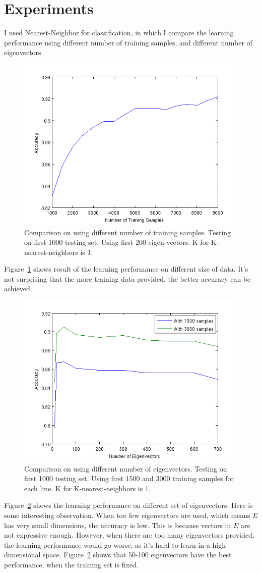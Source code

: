 \documentclass[10pt]{article}
\begin{document}
\section{Experiments}

I used Nearest-Neighbor for classification, in which I compare the
learning performance using different number of training samples, and
different number of eigenvectors.

\begin{figure}
\centering
\includegraphics[width=0.5\columnwidth]{diffDataSet.png}
\caption{Comparison on using different number of training samples.
Testing on first 1000 testing set. Using first 200 eigen-vectors. K
for K-nearest-neighbors is 1.}
\label{fig:dataset}
\end{figure}

Figure~\ref{fig:dataset} shows result of the learning performance on
different size of data. It's not surprising that the more training
data provided, the better accuracy can be achieved.

\begin{figure}
\centering
\includegraphics[width=0.5\columnwidth]{diffEVector.png}
\caption{Comparison on using different number of eigenvectors.
Testing on first 1000 testing set. Using first 1500 and 3000 training
samples for each line.  K for K-nearest-neighbors is 1.}
\label{fig:evec}
\end{figure}

Figure~\ref{fig:evec} shows the learning performance on different set
of eigenvectors. Here is some interesting observation. When too few
eigenvectors are used, which means $E$ has very small dimensions, the
accuracy is low. This is because vectors in $E$ are not expressive
enough. However, when there are too many eigenvectors provided, the
learning performance would go worse, as it's hard to learn in a high
dimensional space.  Figure~\ref{fig:evec} shows that 50-100
eigenvectors have the best performance, when the training set is
fixed.
\end{document}
